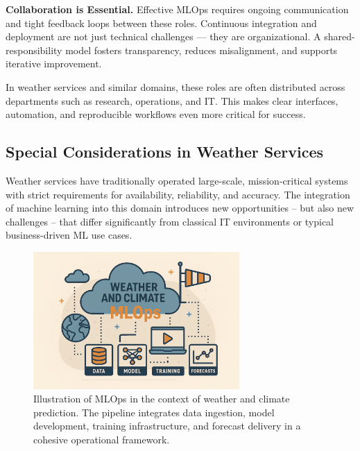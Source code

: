 \noindent
\textbf{Collaboration is Essential.} Effective MLOps requires ongoing communication and tight feedback loops between these roles. Continuous integration and deployment are not just technical challenges — they are organizational. A shared-responsibility model fosters transparency, reduces misalignment, and supports iterative improvement.

In weather services and similar domains, these roles are often distributed across departments such as research, operations, and IT. This makes clear interfaces, automation, and reproducible workflows even more critical for success.

%
\subsection{Special Considerations in Weather Services}

Weather services have traditionally operated large-scale, mission-critical systems with strict requirements for availability, reliability, and accuracy. The integration of machine learning into this domain introduces new opportunities -- but also new challenges -- that differ significantly from classical IT environments or typical business-driven ML use cases.

\begin{figure}[ht]
  \centering
  \includegraphics[width=0.7\textwidth]{images/mlops_weather.png}
  \caption{Illustration of MLOps in the context of weather and climate prediction. The pipeline integrates data ingestion, model development, training infrastructure, and forecast delivery in a cohesive operational framework.}
  \label{fig:mlops-weather}
\end{figure}


